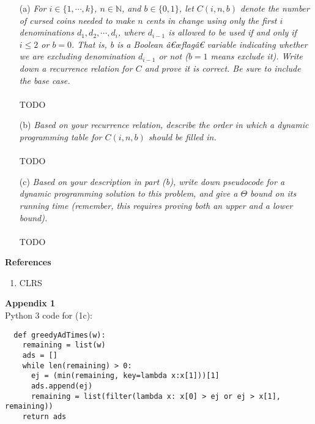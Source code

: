 \documentclass[12pt]{article}
\begin{document}
\begin{enumerate}
\item[(a)]\textit{For $i \in \{1, \cdots, k \}$, $n \in \mathbb{N}$, and $b \in \{0,1\}$, let $C(i, n, b)$ denote the number of cursed coins needed to make $n$ cents in change using only the first $i$ denominations
$d_1, d_2, \cdots, d_i$, where $d_{i-1}$ is allowed to be used if and only if $i \le 2$ or $b = 0$. That is, b is a Boolean â€œflagâ€ variable indicating whether we are excluding denomination
$d_{i-1}$ or not ($b = 1$ means exclude it). Write down a recurrence relation for $C$ and
prove it is correct. Be sure to include the base case.}
\\\\
TODO
\\
\item[(b)]\textit{Based on your recurrence relation, describe the order in which a dynamic programming table for $C(i, n, b)$ should be filled in.}
\\\\
TODO
\\
\item[(c)]\textit{Based on your description in part (b), write down pseudocode for a dynamic
programming solution to this problem, and give a $\Theta$ bound on its running time
(remember, this requires proving both an upper and a lower bound).}
\\\\
TODO

\end{enumerate}


\newpage

\textbf{References} \\
\hrulefill
\begin{enumerate}
  \item CLRS
\end{enumerate}

\newpage

\textbf{Appendix 1} \\
\hrulefill
Python 3 code for (1c): \\
\begin{verbatim}
  def greedyAdTimes(w):
    remaining = list(w)
    ads = []
    while len(remaining) > 0:
      ej = (min(remaining, key=lambda x:x[1]))[1]
      ads.append(ej)
      remaining = list(filter(lambda x: x[0] > ej or ej > x[1], remaining))
    return ads
\end{verbatim}
\end{document}
